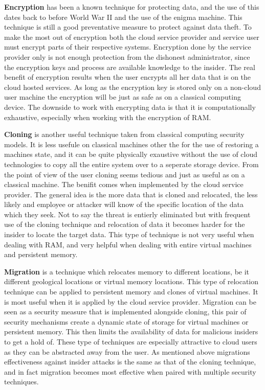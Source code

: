 \textbf{Encryption} has been a known technique for protecting data, and the use of this dates back to before World War II and the use of the enigma machine. This technique is still a good preventative measure to protect against data theft. To make the most out of encryption both the cloud service provider and service user must encrypt parts of their respective systems. \cite{kandias} Encryption done by the service provider only is not enough protection from the dishonest administrator, since the encryption keys and process are available knowledge to the insider. The real benefit of encryption results when the user encrypts all her data that is on the cloud hosted services. \cite{kandias} As long as the encryption key is stored only on a non-cloud user machine the encryption will be just as safe as on a classical computing device. The downside to work with encrypting data is that it is computationally exhaustive, especially when working with the encryption of RAM. \cite{szefer}

\label{llCloning}

\textbf{Cloning} is another useful technique taken from classical computing security models. It is less usefule on classical machines other the for the use of restoring a machines state, and it can be quite physically exaustive without the use of cloud technologies to copy all the entire system over to a seperate storage device. From the point of view of the user cloning seems tedious and just as useful as on a classical machine. The benifit comes when implemented by the cloud service provider. \cite{kandias} The general idea is the more data that is cloned and relocated, the less likely and employee or attacker will know of the specific location of the data which they seek. Not to say the threat is entierly eliminated but with frequent use of the cloning technique and relocation of data it becomes harder for the insider to locate the target data. \cite{szefer} This type of technique is not very useful when dealing with RAM, and very helpful when dealing with entire virtual machines and persistent memory.

\label{llMigration}

\textbf{Migration} is a technique which relocates memory to different locations, be it different geological locations or virtual memory locations. This type of relocation technique can be applied to persistent memory and clones of virtual machines. It is most useful when it is applied by the cloud service provider. \cite{kandias} Migration can be seen as a security measure that is implemented alongside cloning, this pair of security mechanisms create a dynamic state of storage for virtual machines or persistent memory. This then limits the availability of data for malicious insiders to get a hold of. These type of techniques are especially attractive to cloud users as they can be abstracted away from the user. \cite{szefer} As mentioned above migrations effectiveness against insider attacks is the same as that of the cloning technique, and in fact migration becomes most effective when paired with multiple security techniques.

